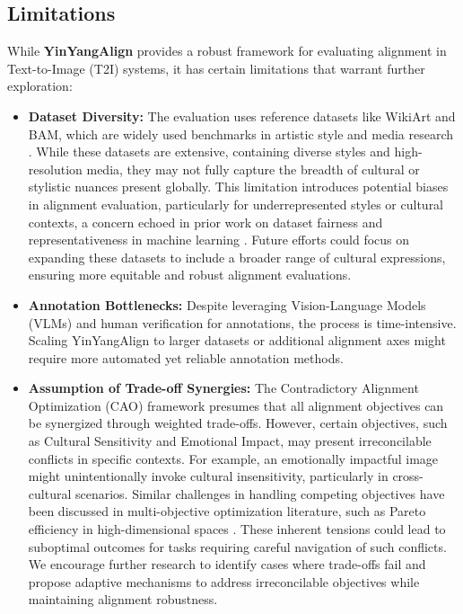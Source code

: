 \subsection{Limitations}
While \textbf{YinYangAlign} provides a robust framework for evaluating alignment in Text-to-Image (T2I) systems, it has certain limitations that warrant further exploration:
\begin{itemize}
    \item \textbf{Dataset Diversity:} The evaluation uses reference datasets like WikiArt and BAM, which are widely used benchmarks in artistic style and media research \cite{saleh2015large, wilber2017bam}. While these datasets are extensive, containing diverse styles and high-resolution media, they may not fully capture the breadth of cultural or stylistic nuances present globally. This limitation introduces potential biases in alignment evaluation, particularly for underrepresented styles or cultural contexts, a concern echoed in prior work on dataset fairness and representativeness in machine learning \cite{gebru2018datasheets, dodge2021documenting}. Future efforts could focus on expanding these datasets to include a broader range of cultural expressions, ensuring more equitable and robust alignment evaluations.
    \item \textbf{Annotation Bottlenecks:} Despite leveraging Vision-Language Models (VLMs) and human verification for annotations, the process is time-intensive. Scaling YinYangAlign to larger datasets or additional alignment axes might require more automated yet reliable annotation methods.
    \item \textbf{Assumption of Trade-off Synergies:} The Contradictory Alignment Optimization (CAO) framework presumes that all alignment objectives can be synergized through weighted trade-offs. However, certain objectives, such as Cultural Sensitivity and Emotional Impact, may present irreconcilable conflicts in specific contexts. For example, an emotionally impactful image might unintentionally invoke cultural insensitivity, particularly in cross-cultural scenarios. Similar challenges in handling competing objectives have been discussed in multi-objective optimization literature, such as Pareto efficiency in high-dimensional spaces \cite{lin2023pareto, miettinen1999nonlinear, navon2022multi}. These inherent tensions could lead to suboptimal outcomes for tasks requiring careful navigation of such conflicts. We encourage further research to identify cases where trade-offs fail and propose adaptive mechanisms to address irreconcilable objectives while maintaining alignment robustness.

\end{itemize}
